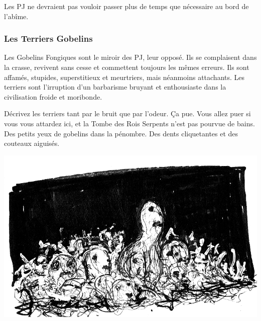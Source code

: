 Les PJ ne devraient pas vouloir passer plus de temps que nécessaire au bord de l'abîme.

\subsubsection{Les Terriers Gobelins}
Les Gobelins Fongiques sont le miroir des PJ, leur opposé.
Ils se complaisent dans la crasse, revivent sans cesse et commettent toujours les mêmes erreurs. 
Ils sont affamés, stupides, superstitieux et meurtriers, mais néanmoins attachants. 
Les terriers sont l'irruption d'un barbarisme bruyant et enthousiaste dans la civilisation froide et moribonde.

Décrivez les terriers tant par le bruit que par l'odeur. 
Ça pue.
Vous allez puer si vous vous attardez ici, et la Tombe des Rois Serpents n'est pas pourvue de bains. 
Des petits yeux de gobelins dans la pénombre. 
Des dents cliquetantes et des couteaux aiguisés.

\includegraphics[width=\columnwidth]{pics/goblin_pit.jpg}